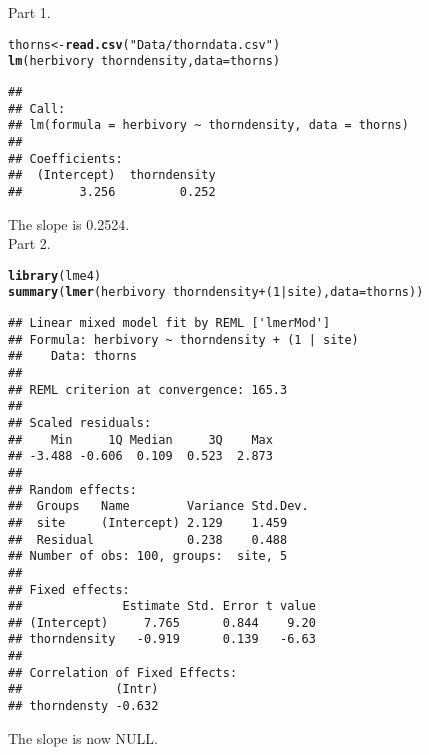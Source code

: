 \documentclass[12pt,a4paper]{scrartcl}\usepackage[]{graphicx}\usepackage[]{color}
\makeatletter
\newcommand{\hlnum}[1]{\textcolor[rgb]{0.686,0.059,0.569}{#1}}%
\newcommand{\hlstr}[1]{\textcolor[rgb]{0.192,0.494,0.8}{#1}}%
\newcommand{\hlopt}[1]{\textcolor[rgb]{0,0,0}{#1}}%
\newcommand{\hlstd}[1]{\textcolor[rgb]{0.345,0.345,0.345}{#1}}%
\newcommand{\hlkwb}[1]{\textcolor[rgb]{0.69,0.353,0.396}{#1}}%
\newcommand{\hlkwc}[1]{\textcolor[rgb]{0.333,0.667,0.333}{#1}}%
\newcommand{\hlkwd}[1]{\textcolor[rgb]{0.737,0.353,0.396}{\textbf{#1}}}%
\newenvironment{kframe}{%
 \def\at@end@of@kframe{}%
 \ifinner\ifhmode%
  \def\at@end@of@kframe{\end{minipage}}%
  \begin{minipage}{\columnwidth}%
 \fi\fi%
 \def\FrameCommand##1{\hskip\@totalleftmargin \hskip-\fboxsep
 \colorbox{shadecolor}{##1}\hskip-\fboxsep
     \hskip-\linewidth \hskip-\@totalleftmargin \hskip\columnwidth}%
 \MakeFramed {\advance\hsize-\width
   \@totalleftmargin\z@ \linewidth\hsize
   \@setminipage}}%
 {\par\unskip\endMakeFramed%
 \at@end@of@kframe}
\newenvironment{knitrout}{}{} %
\makeatother
\begin{document}
\begin{Answer}
Part 1.
\begin{knitrout}
\color{fgcolor}\begin{kframe}
\begin{alltt}
\hlstd{thorns} \hlkwb{<-} \hlkwd{read.csv}\hlstd{(}\hlstr{"Data/thorndata.csv"}\hlstd{)}
\hlkwd{lm}\hlstd{(herbivory} \hlopt{~} \hlstd{thorndensity,} \hlkwc{data}\hlstd{=thorns)}
\end{alltt}
\begin{verbatim}
## 
## Call:
## lm(formula = herbivory ~ thorndensity, data = thorns)
## 
## Coefficients:
##  (Intercept)  thorndensity  
##        3.256         0.252
\end{verbatim}
\end{kframe}
\end{knitrout}
The slope is 0.2524.\\

Part 2.
\begin{knitrout}
\color{fgcolor}\begin{kframe}
\begin{alltt}
\hlkwd{library}\hlstd{(lme4)}
\hlkwd{summary}\hlstd{(}\hlkwd{lmer}\hlstd{(herbivory} \hlopt{~} \hlstd{thorndensity} \hlopt{+} \hlstd{(}\hlnum{1}\hlopt{|}\hlstd{site),} \hlkwc{data}\hlstd{=thorns))}
\end{alltt}
\begin{verbatim}
## Linear mixed model fit by REML ['lmerMod']
## Formula: herbivory ~ thorndensity + (1 | site)
##    Data: thorns
## 
## REML criterion at convergence: 165.3
## 
## Scaled residuals: 
##    Min     1Q Median     3Q    Max 
## -3.488 -0.606  0.109  0.523  2.873 
## 
## Random effects:
##  Groups   Name        Variance Std.Dev.
##  site     (Intercept) 2.129    1.459   
##  Residual             0.238    0.488   
## Number of obs: 100, groups:  site, 5
## 
## Fixed effects:
##              Estimate Std. Error t value
## (Intercept)     7.765      0.844    9.20
## thorndensity   -0.919      0.139   -6.63
## 
## Correlation of Fixed Effects:
##             (Intr)
## thorndensty -0.632
\end{verbatim}
\end{kframe}
\end{knitrout}
The slope is now NULL.\\


\end{Answer}
\end{document}
